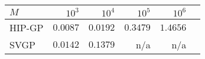 \begin{tabular}{lrrrrr}
\toprule
$M$ &     $10^3$       & $10^4$     & $10^5$     & $10^6$  \\
\midrule
HIP-GP   &  $\mathbf{0.0087}$  &  $\mathbf{0.0192}$  &  $\mathbf{0.3479}$  &  $\mathbf{1.4656}$  \\
SVGP     &  $0.0142$ &   $0.1379$  &   n/a      & n/a       \\
\bottomrule
\end{tabular}
